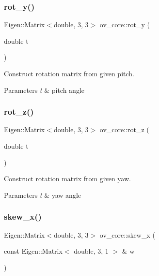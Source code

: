 \subsubsection{\texorpdfstring{rot\+\_\+y()}{rot\_y()}}
{\footnotesize\ttfamily Eigen\+::\+Matrix$<$double, 3, 3$>$ ov\+\_\+core\+::rot\+\_\+y (\begin{DoxyParamCaption}\item[{double}]{t }\end{DoxyParamCaption})\hspace{0.3cm}{\ttfamily [inline]}}



Construct rotation matrix from given pitch. 


\begin{DoxyParams}{Parameters}
{\em t} & pitch angle \\
\hline
\end{DoxyParams}
\mbox{\label{namespaceov__core_a512a53c9e1519a8e202277db433d37d1}} 
\subsubsection{\texorpdfstring{rot\+\_\+z()}{rot\_z()}}
{\footnotesize\ttfamily Eigen\+::\+Matrix$<$double, 3, 3$>$ ov\+\_\+core\+::rot\+\_\+z (\begin{DoxyParamCaption}\item[{double}]{t }\end{DoxyParamCaption})\hspace{0.3cm}{\ttfamily [inline]}}



Construct rotation matrix from given yaw. 


\begin{DoxyParams}{Parameters}
{\em t} & yaw angle \\
\hline
\end{DoxyParams}
\mbox{\label{namespaceov__core_a24012c54df35621a935655b2e230169d}} 
\subsubsection{\texorpdfstring{skew\+\_\+x()}{skew\_x()}}
{\footnotesize\ttfamily Eigen\+::\+Matrix$<$double, 3, 3$>$ ov\+\_\+core\+::skew\+\_\+x (\begin{DoxyParamCaption}\item[{const Eigen\+::\+Matrix$<$ double, 3, 1 $>$ \&}]{w }\end{DoxyParamCaption})\hspace{0.3cm}{\ttfamily [inline]}}



